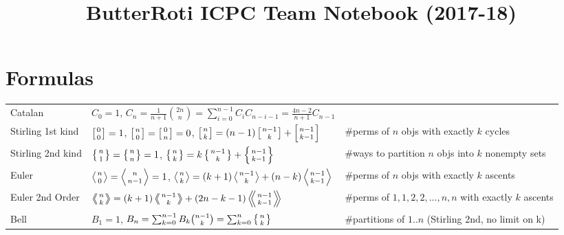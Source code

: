 \documentclass[15pt,a4paper]{article}
\title{\vspace{-4ex}\Large{ButterRoti ICPC Team Notebook (2017-18)}}
\author{}
\date{}
\begin{document}
\begin{landscape}
\begin{multicols}{2}

\maketitle
\vspace{-13ex}
\tableofcontents
\pagestyle{fancy}



\end{multicols}
\newpage
\begingroup
\fontsize{12pt}{12pt}\selectfont
\section{Formulas}
\begin{multicols*}{3}
    \begin{tabular}{@{}l|l|l@{}}
        \toprule
        Catalan &   $C_0=1$, $C_n=\frac{1}{n+1}\binom{2n}{n} = \sum_{i=0}^{n-1}C_iC_{n-i-1} = \frac{4n-2}{n+1}C_{n-1}$  & \\
        Stirling 1st kind & $\left[{0\atop 0}\right]=1$, $\left[{n\atop 0}\right]=\left[{0\atop n}\right]=0$, $\left[{n\atop k}\right]=(n-1)\left[{n-1\atop k}\right]+\left[{n-1\atop k-1}\right]$ & \#perms of $n$ objs with exactly $k$ cycles\\
        Stirling 2nd kind & $\left\{{n\atop 1}\right\}=\left\{{n\atop n}\right\}=1$, $\left\{{n\atop k}\right\} = k \left\{{ n-1 \atop k }\right\} + \left\{{n-1\atop k-1}\right\}$ & \#ways to partition $n$ objs into $k$ nonempty sets\\
        Euler   & $\left \langle {n\atop 0} \right \rangle = \left \langle {n\atop n-1} \right \rangle = 1 $, $\left \langle {n\atop k} \right \rangle = (k+1) \left \langle {n-1\atop {k}} \right \rangle + (n-k)\left \langle {{n-1}\atop {k-1}} \right \rangle$ & \#perms of $n$ objs with exactly $k$ ascents \\
        Euler 2nd Order &  $\left \langle \!\!\left \langle {n\atop k} \right \rangle \!\! \right \rangle = (k+1) \left \langle \!\! \left \langle {{n-1}\atop {k}} \right \rangle \!\! \right \rangle +(2n-k-1)\left \langle \!\! \left \langle {{n-1}\atop {k-1}} \right \rangle  \!\! \right \rangle$ & \#perms of ${1,1,2,2,...,n,n}$ with exactly $k$ ascents \\
        Bell & $B_1 = 1$, $B_n = \sum_{k=0}^{n-1} B_k \binom{n-1}{k} = \sum_{k=0}^n\left\{{n\atop k}\right\}$ & \#partitions of $1..n$ (Stirling 2nd, no limit on k)\\
        \bottomrule
    \end{tabular}


\end{multicols*}
\end{landscape}
\end{document}
